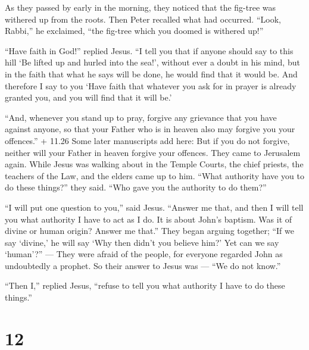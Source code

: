  As they passed by early in the morning, they noticed that
the fig-tree was withered up from the roots.  Then Peter
recalled what had occurred. ``Look, Rabbi,'' he exclaimed, ``the
fig-tree which you doomed is withered up!''

 ``Have faith in God!'' replied Jesus.  ``I
tell you that if anyone should say to this hill `Be lifted up and hurled
into the sea!', without ever a doubt in his mind, but in the faith that
what he says will be done, he would find that it would be. 
And therefore I say to you `Have faith that whatever you ask for in
prayer is already granted you, and you will find that it will be.'

 ``And, whenever you stand up to pray, forgive any
grievance that you have against anyone, so that your Father who is in
heaven also may forgive you your offences.''  + 11.26 Some
later manuscripts add here: But if you do not forgive, neither will your
Father in heaven forgive your offences.  They came to
Jerusalem again. While Jesus was walking about in the Temple Courts, the
chief priests, the teachers of the Law, and the elders came up to him.
 ``What authority have you to do these things?'' they said.
``Who gave you the authority to do them?''

 ``I will put one question to you,'' said Jesus. ``Answer
me that, and then I will tell you what authority I have to act as I do.
 It is about John's baptism. Was it of divine or human
origin? Answer me that.''  They began arguing together;
``If we say `divine,' he will say `Why then didn't you believe him?'
 Yet can we say `human'?'' --- They were afraid of the
people, for everyone regarded John as undoubtedly a prophet.
 So their answer to Jesus was --- ``We do not know.''

``Then I,'' replied Jesus, ``refuse to tell you what authority I have to
do these things.''

\hypertarget{section-11}{%
\section{12}\label{section-11}}

